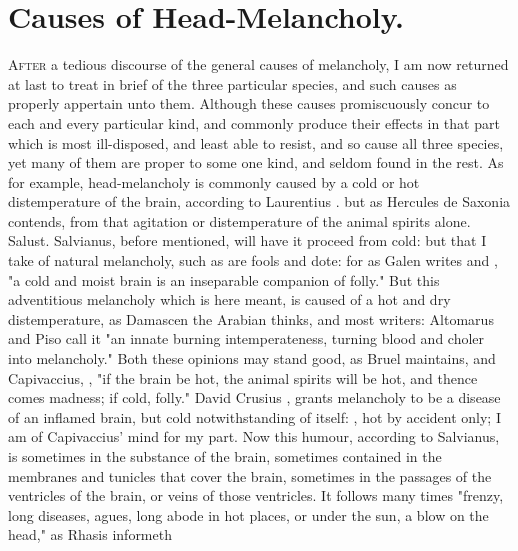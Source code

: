 \section{Causes of Head-Melancholy.}

\lettrine{A}{fter} a tedious discourse of the general causes of melancholy, I
am now returned at last to treat in brief of the three particular species, and
such causes as properly appertain unto them. Although these causes
promiscuously concur to each and every particular kind, and commonly produce
their effects in that part which is most ill-disposed, and least able to
resist, and so cause all three species, yet many of them are proper to some one
kind, and seldom found in the rest. As for example, head-melancholy is commonly
caused by a cold or hot distemperature of the brain, according to Laurentius
. but as Hercules de
Saxonia contends, from that agitation or distemperature of the animal spirits
alone. Salust. Salvianus, before mentioned,  will have it proceed from cold: but that I take of natural
melancholy, such as are fools and dote: for as Galen writes
 and \Avicenna{},
"a cold and moist brain is an inseparable companion of
folly." But this adventitious melancholy which is here meant, is caused of a
hot and dry distemperature, as Damascen the Arabian
 thinks, and most writers: Altomarus and
Piso call it "an innate burning intemperateness, turning
blood and choler into melancholy." Both these opinions may stand good, as Bruel
maintains, and Capivaccius, ,
"if the brain be hot, the animal spirits will be hot, and
thence comes madness; if cold, folly." David Crusius
,
grants melancholy to be a disease of an inflamed brain, but cold
notwithstanding of itself: , hot by
accident only; I am of Capivaccius' mind for my part. Now this humour,
according to Salvianus, is sometimes in the substance of the brain, sometimes
contained in the membranes and tunicles that cover the brain, sometimes in the
passages of the ventricles of the brain, or veins of those ventricles. It
follows many times "frenzy, long diseases, agues, long
abode in hot places, or under the sun, a blow on the head," as Rhasis informeth
